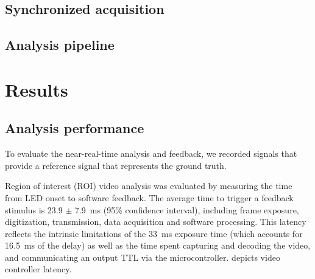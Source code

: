 \subsection{Synchronized acquisition}


\subsection{Analysis pipeline}


\section{Results}


\subsection{Analysis performance}

To evaluate the near-real-time analysis and feedback, we recorded 
signals that provide a reference signal that represents the 
ground truth. 

Region of interest (ROI) video analysis was evaluated by measuring the
time from LED onset to software feedback. The average time to trigger 
a feedback stimulus is 23.9 $\pm$ 7.9~ms (95\% confidence interval), 
including frame exposure, digitization, transmission, data acquisition 
and software processing. This latency reflects the intrinsic 
limitations of the 33~ms exposure time (which accounts for 16.5~ms of 
the delay) as well as the time spent capturing and decoding the video, 
and communicating an output TTL via the microcontroller. 
 depicts video controller latency.


